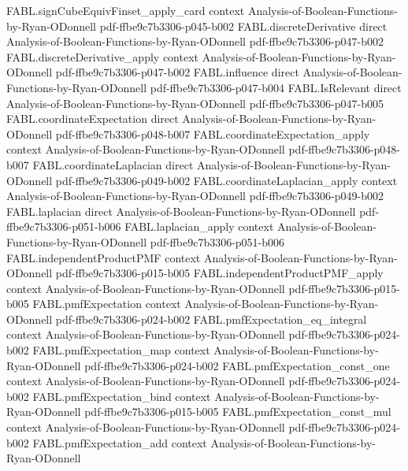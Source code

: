 \begin{theorem}
  {FABL.signCubeEquivFinset_apply_card}
  {context}
  {Analysis-of-Boolean-Functions-by-Ryan-ODonnell}
  {pdf-ffbe9c7b3306-p045-b002}
\proofstep
  {FABL.discreteDerivative}
  {direct}
  {Analysis-of-Boolean-Functions-by-Ryan-ODonnell}
  {pdf-ffbe9c7b3306-p047-b002}
\proofstep
  {FABL.discreteDerivative_apply}
  {context}
  {Analysis-of-Boolean-Functions-by-Ryan-ODonnell}
  {pdf-ffbe9c7b3306-p047-b002}
\proofstep
  {FABL.influence}
  {direct}
  {Analysis-of-Boolean-Functions-by-Ryan-ODonnell}
  {pdf-ffbe9c7b3306-p047-b004}
\proofstep
  {FABL.IsRelevant}
  {direct}
  {Analysis-of-Boolean-Functions-by-Ryan-ODonnell}
  {pdf-ffbe9c7b3306-p047-b005}
\proofstep
  {FABL.coordinateExpectation}
  {direct}
  {Analysis-of-Boolean-Functions-by-Ryan-ODonnell}
  {pdf-ffbe9c7b3306-p048-b007}
\proofstep
  {FABL.coordinateExpectation_apply}
  {context}
  {Analysis-of-Boolean-Functions-by-Ryan-ODonnell}
  {pdf-ffbe9c7b3306-p048-b007}
\proofstep
  {FABL.coordinateLaplacian}
  {direct}
  {Analysis-of-Boolean-Functions-by-Ryan-ODonnell}
  {pdf-ffbe9c7b3306-p049-b002}
\proofstep
  {FABL.coordinateLaplacian_apply}
  {context}
  {Analysis-of-Boolean-Functions-by-Ryan-ODonnell}
  {pdf-ffbe9c7b3306-p049-b002}
\proofstep
  {FABL.laplacian}
  {direct}
  {Analysis-of-Boolean-Functions-by-Ryan-ODonnell}
  {pdf-ffbe9c7b3306-p051-b006}
\proofstep
  {FABL.laplacian_apply}
  {context}
  {Analysis-of-Boolean-Functions-by-Ryan-ODonnell}
  {pdf-ffbe9c7b3306-p051-b006}
\proofstep
  {FABL.independentProductPMF}
  {context}
  {Analysis-of-Boolean-Functions-by-Ryan-ODonnell}
  {pdf-ffbe9c7b3306-p015-b005}
\proofstep
  {FABL.independentProductPMF_apply}
  {context}
  {Analysis-of-Boolean-Functions-by-Ryan-ODonnell}
  {pdf-ffbe9c7b3306-p015-b005}
\proofstep
  {FABL.pmfExpectation}
  {context}
  {Analysis-of-Boolean-Functions-by-Ryan-ODonnell}
  {pdf-ffbe9c7b3306-p024-b002}
\proofstep
  {FABL.pmfExpectation_eq_integral}
  {context}
  {Analysis-of-Boolean-Functions-by-Ryan-ODonnell}
  {pdf-ffbe9c7b3306-p024-b002}
\proofstep
  {FABL.pmfExpectation_map}
  {context}
  {Analysis-of-Boolean-Functions-by-Ryan-ODonnell}
  {pdf-ffbe9c7b3306-p024-b002}
\proofstep
  {FABL.pmfExpectation_const_one}
  {context}
  {Analysis-of-Boolean-Functions-by-Ryan-ODonnell}
  {pdf-ffbe9c7b3306-p024-b002}
\proofstep
  {FABL.pmfExpectation_bind}
  {context}
  {Analysis-of-Boolean-Functions-by-Ryan-ODonnell}
  {pdf-ffbe9c7b3306-p015-b005}
\proofstep
  {FABL.pmfExpectation_const_mul}
  {context}
  {Analysis-of-Boolean-Functions-by-Ryan-ODonnell}
  {pdf-ffbe9c7b3306-p024-b002}
\proofstep
  {FABL.pmfExpectation_add}
  {context}
  {Analysis-of-Boolean-Functions-by-Ryan-ODonnell}

\end{theorem}
